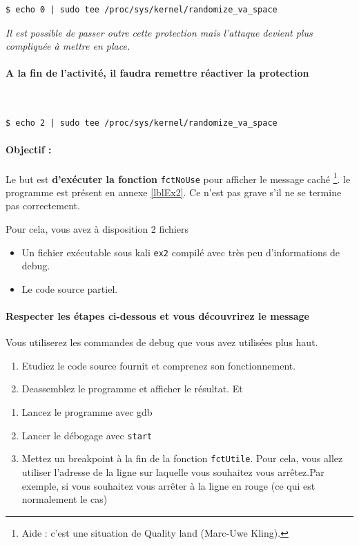 \documentclass[french, 12pt]{article}%
\newcommand{\itemE}{\item[$\bullet$]}
\begin{document}
\begin{lstlisting}[style=commande]
$ echo 0 | sudo tee /proc/sys/kernel/randomize_va_space
\end{lstlisting}

\textit{Il est possible de passer outre cette protection mais l'attaque devient plus compliquée à mettre en place.} \ 


\paragraph{A la fin de l'activité, il faudra remettre réactiver  la protection} \ 

\begin{lstlisting}[style=commande]
$ echo 2 | sudo tee /proc/sys/kernel/randomize_va_space
\end{lstlisting}




\paragraph{Objectif : }
Le but est \textbf{d'exécuter la fonction } \verb?fctNoUse? pour afficher le message caché \footnote{Aide : c'est une situation de  Quality land (Marc-Uwe Kling).}. le programme est présent en annexe \ref{lblEx2}. Ce n'est pas grave s'il ne se termine pas correctement.  


Pour cela, vous avez à disposition 2 fichiers 
\begin{itemize}
\itemE Un fichier exécutable sous kali \verb?ex2? compilé avec très peu d'informations de debug.
\itemE Le code source partiel. 
\end{itemize}



\paragraph{Respecter les étapes ci-dessous et vous découvrirez le message} Vous utiliserez les commandes de debug que vous avez utilisées plus haut.
\begin{enumerate}
\item Etudiez le code source fournit et comprenez son fonctionnement.
\item Deassemblez le programme et afficher le résultat. Et 
\end{enumerate}




\begin{enumerate}[resume]
\item Lancez le programme avec gdb
\item Lancer le débogage avec \verb?start?
\item Mettez un breakpoint à la fin de la fonction \verb?fctUtile?. Pour cela, vous allez utiliser l'adresse de la ligne sur laquelle vous souhaitez vous arrêtez.Par exemple, si vous souhaitez vous arrêter à la ligne en rouge  (ce qui est normalement le cas)
\end{enumerate}
\end{document}
